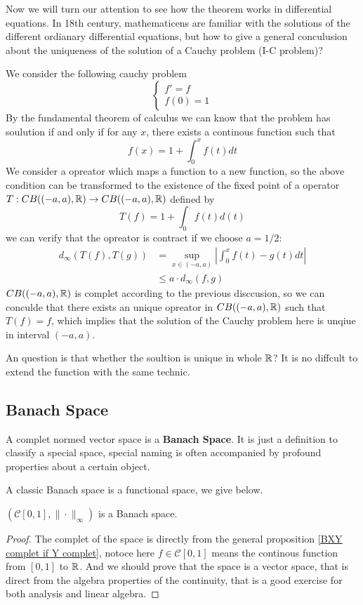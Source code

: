 \documentclass[en,hazy,blue,normal,12pt]{elegantnote}
\begin{document}
Now we will turn our attention to see how the theorem works in differential equations. In 18th century, mathematicens are familiar with the solutions of the different ordianary differential equations, but how to give a general conculusion about the uniqueness of the solution of a Cauchy problem (I-C problem)?

\begin{example}
    We consider the following cauchy problem 
    \[\begin{cases}
        f'=f \\
        f(0)=1
    \end{cases}\]
    By the fundamental theorem of calculus we can know that the problem has soulution if and only if for any \(x\), there exists a continous function such that 
    \[f(x) = 1+ \int^x_0 f(t)dt\]
    We consider a opreator which maps a function to a new function, so the above condition can be transformed to the existence of the fixed point of a operator \(T: CB((-a,a),\mathbb{R}) \to CB((-a,a),\mathbb{R})\) defined by 
    \[T(f) = 1+\int_0^{.}f(t)d(t)\]
    we can verify that the opreator is contract if we choose \(a =1/2\):
    \begin{align*}
        d_{\infty}(T(f),T(g)) &= \sup_{x \in (-a,a)}|\int_{0}^{x}f(t)-g(t)dt| \\
        &\leq a \cdot d_{\infty}(f,g)
    \end{align*}
    \(CB((-a,a),\mathbb{R})\) is complet according to the previous disccusion, so we can conculde that there exists an unique opreator in \(CB((-a,a),\mathbb{R})\) such that \(T(f)=f\), which implies that the solution of the Cauchy problem here is unqiue in interval \((-a,a)\). 

    An question is that whether the soultion is unique in whole \(\mathbb{R}\)? It is no diffcult to extend the function with the same technic. 
\end{example}

\subsection{Banach Space}

A complet normed vector space is a \textbf{Banach Space}. It is just a  definition to classify a special space, special naming is often accompanied by profound properties about a certain object. 

A classic Banach space is a functional space, we give below.

\begin{proposition}
    \((\mathcal{C} [0,1],\|\cdot\|_{\infty})\) is a Banach space.

    \begin{proof}
        The complet of the space is directly from the general proposition \ref{BXY complet if Y complet}, notoce here \(f \in \mathcal{C} [0,1]\) means the continous function from \([0,1]\) to \(\mathbb{R}\). And we should prove that the space is a vector space, that is direct from the algebra properties of the continuity, that is a good exercise for both analysis and linear algebra.
    \end{proof}
\end{proposition}
\end{document}
